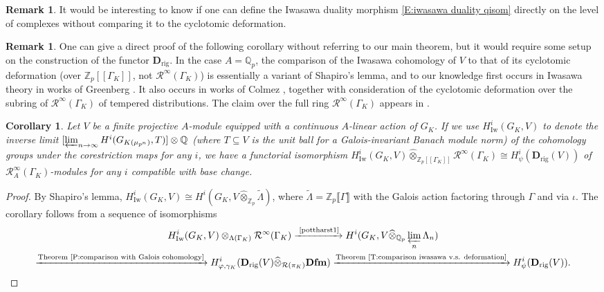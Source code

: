 \documentclass[12pt]{article}
\newtheorem{cor}[theorem]{Corollary}
\theoremstyle{definition}
\newtheorem{remark}[theorem]{Remark}
\numberwithin{equation}{theorem}
\newcommand{\calR}{\mathcal{R}}
\newcommand{\QQ}{\mathbb{Q}}
\newcommand{\ZZ}{\mathbb{Z}}
\newcommand{\bbD}{\mathbf{D}}
\newcommand{\Dfm}{\mathbf{Dfm}}
\newcommand{\Iw}{\mathrm{Iw}}
\def\Qp{\QQ_p}
\newcommand{\rig}{\mathrm{rig}}
\newcommand{\Zp}{\ZZ_p}
\begin{document}
\begin{remark}
It would be interesting to know if one can define the Iwasawa duality morphism \eqref{E:iwasawa duality qisom} directly on the level of complexes without comparing it to the cyclotomic deformation.
\end{remark}

\begin{remark}
One can give a direct proof of the following corollary without
referring to our main theorem, but it would require some setup on the
construction of the functor $\bbD_\rig$.  In the case $A=\Qp$, the
comparison of the Iwasawa cohomology of $V$ to that of its cyclotomic
deformation (over $\Zp[\![\Gamma_K]\!]$, not $\calR^\infty(\Gamma_K)$)
is essentially a variant of Shapiro's lemma, and to our knowledge
first occurs in Iwasawa theory in works of Greenberg \cite{greenberg}.
It also occurs in works of Colmez \cite{colmez-Iw}, together with
consideration of the cyclotomic deformation over the subring of
$\calR^\infty(\Gamma_K)$ of tempered distributions.  The claim over
the full ring $\calR^\infty(\Gamma_K)$ appears in \cite{pottharst2}.
\end{remark}

\begin{cor}
Let $V$ be a finite projective $A$-module equipped with a continuous $A$-linear action of $G_K$.  If we use $H^i_\Iw(G_K,V)$ to denote the inverse limit $[\varprojlim_{n \to \infty} H^i(G_{K(\mu_{p^n})}, T)] \otimes \QQ$ (where $T \subseteq V$ is the unit ball for a Galois-invariant Banach module norm) of the cohomology groups under the corestriction maps for any $i$, we have a functorial isomorphism $H^i_\Iw(G_K,V) \widehat \otimes_{\ZZ_p[\![\Gamma_K]\!]} \calR^\infty(\Gamma_K) \cong
H^i_\psi(\bbD_\rig(V))$ of $\calR_A^\infty(\Gamma_K)$-modules for any $i$ compatible with base change.
\end{cor}
\begin{proof}
By Shapiro's lemma, $H^i_\Iw(G_K,V)  \cong H^i(G_K, V \widehat \otimes_{\Zp} \tilde \Lambda)$, where $\tilde \Lambda = \Zp\llbracket \Gamma\rrbracket$ with the Galois action factoring through $\Gamma$ and via $\iota$.  The corollary follows from a sequence of isomorphisms
\begin{multline*}
H^i_\Iw(G_K,V) \otimes_{\Lambda(\Gamma_K)} \calR^\infty(\Gamma_K) \xrightarrow{\textrm{ \cite[Theorem~1.6]{pottharst1}}} H^i(G_K, V \widehat \otimes_{\Qp} \varprojlim_n \Lambda_n )\\
\xrightarrow{\textrm{Theorem~\ref{P:comparison with Galois cohomology}}} H^i_{\varphi, \gamma_K}(\bbD_\rig(V) \widehat \otimes_{\calR(\pi_K)} \Dfm) \xrightarrow{\textrm{Theorem~\ref{T:comparison iwasawa v.s. deformation}}} H^i_\psi(\bbD_\rig(V)).
\end{multline*}
\end{proof}
\end{document}
